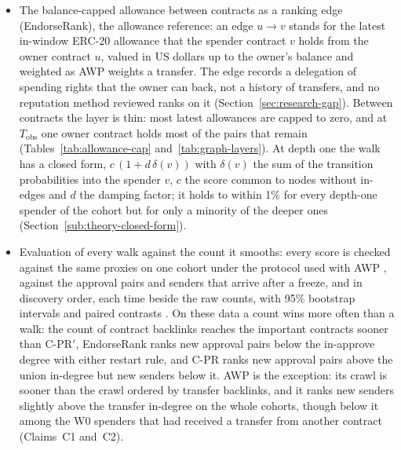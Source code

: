 \begin{itemize}
\item The balance-capped allowance between contracts as a ranking edge (EndorseRank), the allowance reference: an edge $u \to v$ stands for the latest in-window ERC-20 allowance that the spender contract $v$ holds from the owner contract $u$, valued in US dollars up to the owner's balance and weighted as AWP weights a transfer. The edge records a delegation of spending rights that the owner can back, not a history of transfers, and no reputation method reviewed ranks on it (Section~\ref{sec:research-gap}). Between contracts the layer is thin: most latest allowances are capped to zero, and at $T_{\mathrm{obs}}$ one owner contract holds most of the pairs that remain (Tables~\ref{tab:allowance-cap} and~\ref{tab:graph-layers}). At depth one the walk has a closed form, $c\,(1+d\,\delta(v))$ with $\delta(v)$ the sum of the transition probabilities into the spender $v$, $c$ the score common to nodes without in-edges and $d$ the damping factor; it holds to within 1\% for every depth-one spender of the cohort but for only a minority of the deeper ones (Section~\ref{sub:theory-closed-form}).
\item Evaluation of every walk against the count it smooths: every score is checked against the same proxies on one cohort under the protocol used with AWP \parencite{do2023awp}, against the approval pairs and senders that arrive after a freeze, and in discovery order, each time beside the raw counts, with 95\% bootstrap intervals and paired contrasts \parencite{efron1979bootstrap}. On these data a count wins more often than a walk: the count of contract backlinks reaches the important contracts sooner than \mbox{C-PR}$'$, EndorseRank ranks new approval pairs below the in-approve degree with either restart rule, and \mbox{C-PR} ranks new approval pairs above the union in-degree but new senders below it. AWP is the exception: its crawl is sooner than the crawl ordered by transfer backlinks, and it ranks new senders slightly above the transfer in-degree on the whole cohorts, though below it among the W0 spenders that had received a transfer from another contract (Claims~C1 and~C2).
\end{itemize}



